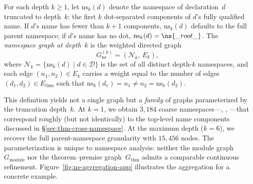 \begin{definition}
\label{def:ns-graph}
For each depth $k \ge 1$, let $\mathrm{ns}_k(d)$ denote the namespace of declaration~$d$ truncated to depth~$k$: the first $k$ dot-separated components of $d$'s fully qualified name. If $d$'s name has fewer than $k+1$ components, $\mathrm{ns}_k(d)$ defaults to the full parent namespace; if $d$'s name has no dot, $\mathrm{ns}_k(d) = \ns{\_root\_}$. The \emph{namespace graph at depth~$k$} is the weighted directed graph
\[
  G_{\mathrm{ns}}^{(k)} = (\mathcal{N}_k,\, E_k),
\]
where $\mathcal{N}_k = \{\mathrm{ns}_k(d) \mid d \in \mathcal{D}\}$ is the set of all distinct depth-$k$ namespaces, and each edge $(n_1, n_2) \in E_k$ carries a weight equal to the number of edges $(d_1, d_2) \in E_{\mathrm{thm}}$ such that $\mathrm{ns}_k(d_1) = n_1 \neq n_2 = \mathrm{ns}_k(d_2)$.
\end{definition}

This definition yields not a single graph but a \emph{family} of graphs parameterized by the truncation depth~$k$. At $k = 1$, we obtain $3{,}184$ coarse namespaces---, , ---that correspond roughly (but not identically) to the top-level name components discussed in \S\ref{sec:thm-cross-namespace}. At the maximum depth ($k = 6$), we recover the full parent-namespace granularity with $15{,}456$ nodes. The parameterization is unique to namespace analysis: neither the module graph~$G_{\mathrm{module}}$ nor the theorem--premise graph~$G_{\mathrm{thm}}$ admits a comparable continuous refinement. Figure~\ref{fig:ns-aggregation-app} illustrates the aggregation for a concrete example.

